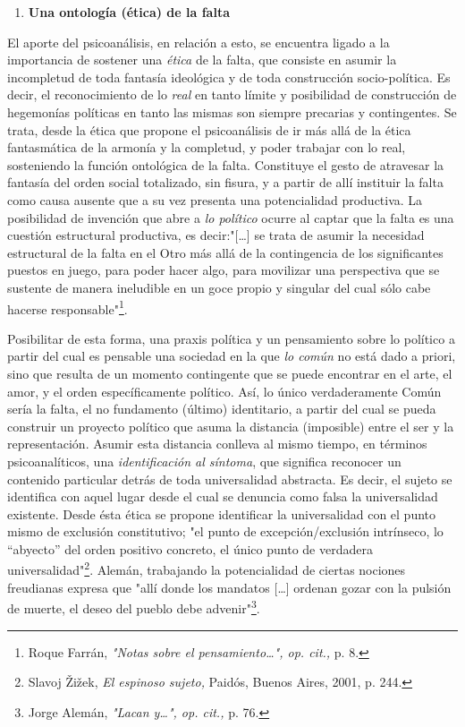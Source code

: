 \documentclass{book}
\begin{document}
\begin{enumerate}
\def\labelenumi{\arabic{enumi}.}
\setcounter{enumi}{6}
\item
  \textbf{Una ontología (ética) de la falta}
\end{enumerate}

El aporte del psicoanálisis, en relación a esto, se encuentra ligado a
la importancia de sostener una \emph{ética} de la falta, que consiste en
asumir la incompletud de toda fantasía ideológica y de toda construcción
socio-política. Es decir, el reconocimiento de lo \emph{real} en tanto
límite y posibilidad de construcción de hegemonías políticas en tanto
las mismas son siempre precarias y contingentes. Se trata, desde la
ética que propone el psicoanálisis de ir más allá de la ética
fantasmática de la armonía y la completud, y poder trabajar con lo real,
sosteniendo la función ontológica de la falta. Constituye el gesto de
atravesar la fantasía del orden social totalizado, sin fisura, y a
partir de allí instituir la falta como causa ausente que a su vez
presenta una potencialidad productiva. La posibilidad de invención que
abre a \emph{lo político} ocurre al captar que la falta es una cuestión
estructural productiva, es decir:"{[}\ldots{]} se trata de asumir la
necesidad estructural de la falta en el Otro más allá de la contingencia
de los significantes puestos en juego, para poder hacer algo, para
movilizar una perspectiva que se sustente de manera ineludible en un
goce propio y singular del cual sólo cabe hacerse
responsable"\footnote{Roque Farrán, \emph{"Notas sobre el
  pensamiento\ldots", op. cit.,} p. 8.}.

Posibilitar de esta forma, una praxis política y un pensamiento sobre lo
político a partir del cual es pensable una sociedad en la que \emph{lo
común} no está dado a priori, sino que resulta de un momento contingente
que se puede encontrar en el arte, el amor, y el orden específicamente
político. Así, lo único verdaderamente Común sería la falta, el no
fundamento (último) identitario, a partir del cual se pueda construir un
proyecto político que asuma la distancia (imposible) entre el ser y la
representación. Asumir esta distancia conlleva al mismo tiempo, en
términos psicoanalíticos, una \emph{identificación al síntoma}, que
significa reconocer un contenido particular detrás de toda universalidad
abstracta. Es decir, el sujeto se identifica con aquel lugar desde el
cual se denuncia como falsa la universalidad existente. Desde ésta ética
se propone identificar la universalidad con el punto mismo de exclusión
constitutivo; "el punto de excepción/exclusión intrínseco, lo
``abyecto'' del orden positivo concreto, el único punto de verdadera
universalidad"\footnote{Slavoj Žižek, \emph{El espinoso sujeto,} Paidós,
  Buenos Aires, 2001, p. 244.}. Alemán, trabajando la potencialidad de
ciertas nociones freudianas expresa que "allí donde los mandatos
{[}\ldots{]} ordenan gozar con la pulsión de muerte, el deseo del pueblo
debe advenir"\footnote{Jorge Alemán, \emph{"Lacan y\ldots", op. cit.,}
  p. 76.}.
\end{document}
